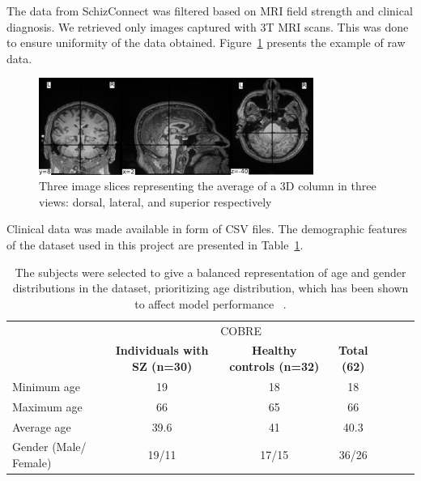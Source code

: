 The data from SchizConnect was filtered based on MRI field strength and clinical diagnosis. We retrieved only images captured with 3T MRI scans. This was done to ensure uniformity of the data obtained. Figure~\ref{fig:raw_mri_volume_slices} presents the example of raw data.
\begin{figure}[h]
    \centering
    \includegraphics[width=0.8\textwidth]{./figs/sample_volume.png} %
    \caption{Three image slices representing the average of a 3D column in three views: dorsal, lateral, and superior respectively}\label{fig:raw_mri_volume_slices}
\end{figure}

Clinical data was made available in form of CSV files. The demographic features of the dataset used in this project are presented in Table~\ref{tab:cobre_clinical_demographic}.
\begin{center}
	\begin{table}
        \centering
        \caption{\label{tab:cobre_clinical_demographic}The subjects were selected to give a balanced representation of age and gender distributions in the dataset, prioritizing age distribution, which has been shown to affect model performance ~\cite{Oh2020}.}
        \begin{tabular*}{500pt}{@{\extracolsep\fill}lcccccc@{\extracolsep\fill}}
            \toprule
            & \multicolumn{3}{c}{COBRE}
            \\\cmidrule{2-4}
            & \textbf{Individuals with SZ (n=30)} & \textbf{Healthy controls (n=32)} & \textbf{Total (62)} \\
            \midrule
            Minimum age             & 19  & 18  & 18 \\
            Maximum age 		    & 66  & 65 & 66  \\
            Average age             & 39.6 & 41 & 40.3	\\
            Gender (Male/ Female)   & 19/11 & 17/15 & 36/26	\\
            \bottomrule
        \end{tabular*}
    \end{table}    
\end{center}

